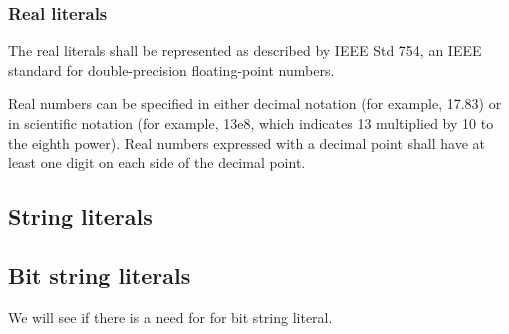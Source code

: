\subsubsection{Real literals}

The real literals shall be represented as described by IEEE Std 754, an IEEE standard for double-precision floating-point numbers.

Real numbers can be specified in either decimal notation (for example, 17.83) or in scientific notation (for example, 13e8, which indicates 13 multiplied by 10 to the eighth power).
Real numbers expressed with a decimal point shall have at least one digit on each side of the decimal point.

\subsection{String literals}

\subsection{Bit string literals}

We will see if there is a need for for bit string literal.
